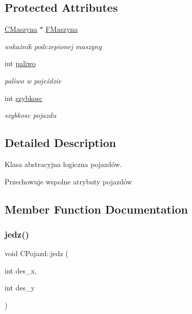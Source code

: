 \subsection*{Protected Attributes}
\begin{DoxyCompactItemize}
\item 
\mbox{\label{class_c_pojazd_abe30e6d7e643b969f41c9914ba97280a}} 
\mbox{\hyperlink{class_c_maszyna}{C\+Maszyna}} $\ast$ \mbox{\hyperlink{class_c_pojazd_abe30e6d7e643b969f41c9914ba97280a}{F\+Maszyna}}
\begin{DoxyCompactList}\small\item\em wskażnik podczepionej maszyny \end{DoxyCompactList}\item 
\mbox{\label{class_c_pojazd_accde27ae44aab73f56cfb2b497e30eab}} 
int \mbox{\hyperlink{class_c_pojazd_accde27ae44aab73f56cfb2b497e30eab}{paliwo}}
\begin{DoxyCompactList}\small\item\em paliwo w pojeździe \end{DoxyCompactList}\item 
\mbox{\label{class_c_pojazd_a5af2e841175da5b531f77d46879dd56c}} 
int \mbox{\hyperlink{class_c_pojazd_a5af2e841175da5b531f77d46879dd56c}{szybkosc}}
\begin{DoxyCompactList}\small\item\em szybkosc pojazdu \end{DoxyCompactList}\end{DoxyCompactItemize}


\subsection{Detailed Description}
Klasa abstracyjna logiczna pojazdów. 

Przechowuje wspolne atrybuty pojazdów 

\subsection{Member Function Documentation}
\mbox{\label{class_c_pojazd_ae5b5838c2c769399f73216e02c181c84}} 
\subsubsection{\texorpdfstring{jedz()}{jedz()}}
{\footnotesize\ttfamily void C\+Pojazd\+::jedz (\begin{DoxyParamCaption}\item[{int}]{des\+\_\+x,  }\item[{int}]{des\+\_\+y }\end{DoxyParamCaption})}



